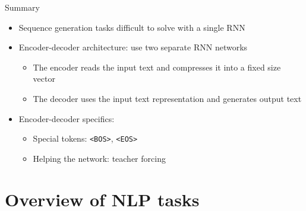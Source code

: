 \documentclass[12pt,aspectratio=169,handout]{beamer}
\begin{document}
\begin{frame}[fragile]{Summary}

	\begin{itemize}
		\item Sequence generation tasks difficult to solve with a single RNN
		\item Encoder-decoder architecture: use two separate RNN networks
		\begin{itemize}
			\item The encoder reads the input text and compresses it into a fixed size vector
			\item The decoder uses the input text representation and generates output text
		\end{itemize}
		\item Encoder-decoder specifics:
		\begin{itemize}
			\item Special tokens: \verb|<BOS>|, \verb|<EOS>|
			\item Helping the network: teacher forcing
		\end{itemize}
	\end{itemize}

\end{frame}

\section{Overview of NLP tasks}
\end{document}

